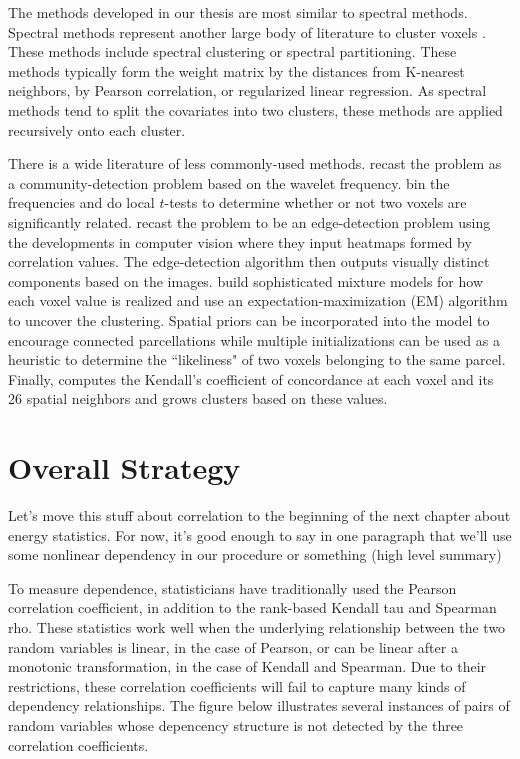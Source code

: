 {The methods developed in our thesis are most similar to spectral
methods. Spectral methods represent another large body of literature to
cluster voxels
\cite{craddock2012whole,van2008normalized,shen2010graph,newman2006modularity,shen2013groupwise,zhang2014robust}.
These methods include spectral clustering or spectral partitioning.
These methods typically form the weight matrix by the distances from
K-nearest neighbors, by Pearson correlation, or regularized linear
regression. As spectral methods tend to split the covariates into two
clusters, these methods are applied recursively onto each cluster.

There is a wide literature of less commonly-used methods.
\cite{alexander2012discovery} recast the problem as a
community-detection problem based on the wavelet frequency.
\cite{baria2011anatomical} bin the frequencies and do local $t$-tests
to determine whether or not two voxels are significantly related.
\cite{cohen2008defining, gordon2014generation, barnes2011parcellation}
recast the problem to be an edge-detection problem using the
developments in computer vision where they input heatmaps formed by
correlation values. The edge-detection algorithm then outputs visually
distinct components based on the images.
\cite{ryali2013parcellation,pohl2007hierarchical} build sophisticated
mixture models for how each voxel value is realized and use an
expectation-maximization (EM) algorithm to uncover the clustering.
Spatial priors can be incorporated into the model to encourage
connected parcellations while multiple initializations can be used as a
heuristic to determine the ``likeliness" of two voxels belonging to the
same parcel. Finally, \cite{blumensath2013spatially} computes the
Kendall's coefficient of concordance at each voxel and its 26 spatial
neighbors and grows clusters based on these values.
}

\section{Overall Strategy}
{\color{red}
Let's move this stuff about correlation to the beginning of the next
chapter about energy statistics. For now, it's good enough to say in
one paragraph that we'll use some nonlinear dependency in our
procedure or something (high level summary)}

To measure dependence, statisticians have traditionally used the Pearson
correlation coefficient, in addition to the rank-based Kendall tau and
Spearman rho. These statistics work well when the underlying
relationship between the two random variables is linear, in the case of
Pearson, or can be linear after a monotonic transformation, in the case
of Kendall and Spearman. Due to their restrictions, these correlation
coefficients will fail to capture many kinds of dependency
relationships. The figure below illustrates several instances of pairs
of random variables whose depencency structure is not detected by the
three correlation coefficients.

